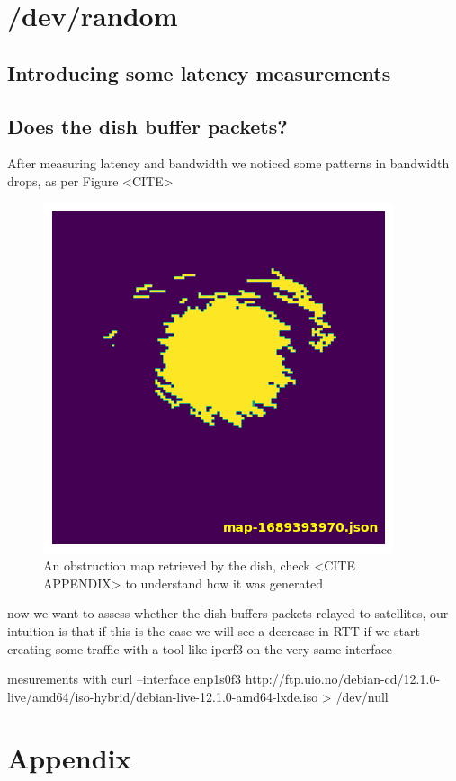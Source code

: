 \documentclass[IN,11pt,twoside,openright,bachelor,english]{tumthesis}
\begin{document}
\chapter{/dev/random}

\section{Introducing some latency measurements}
\section{Does the dish buffer packets?}

After measuring latency and bandwidth we noticed some patterns in bandwidth drops, as per Figure <CITE> 

\begin{figure}
	\centering
	\includegraphics[]{img/obstruction_map_finale.png}
	\caption{An obstruction map retrieved by the dish, check <CITE APPENDIX> to understand how it was generated}
\end{figure}

now we want to assess whether the dish buffers packets relayed to satellites, our intuition is that if this is the case we will see a decrease in RTT if we start creating some traffic with a tool like iperf3 on the very same interface

mesurements with  curl --interface enp1s0f3 http://ftp.uio.no/debian-cd/12.1.0-live/amd64/iso-hybrid/debian-live-12.1.0-amd64-lxde.iso > /dev/null

\appendix
\chapter{Appendix}
\label{chap:appendix}
\end{document}
